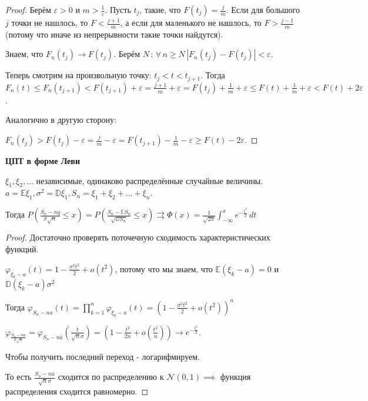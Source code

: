 \begin{proof}
    Берём $\varepsilon > 0$ и $m > \frac{1}{\varepsilon}$. Пусть $t_j$, такие, что $F(t_j) = \frac{j}{m}$. Если для большого $j$ точки не нашлось, то
    $F < \frac{j + 1}{m}$, а если для маленького не нашлось, то $F > \frac{j - 1}{m}$ (потому что иначе из непрерывности такие точки найдутся).

    Знаем, что $F_n(t_j) \rightarrow F(t_j)$. Берём $N \, : \, \forall \, n \geqslant N \, |F_n(t_j) - F(t_j)| < \varepsilon$.

    Теперь смотрим на произвольную точку: $t_j < t < t_{j + 1}$. Тогда
    $F_n(t) \leqslant F_n(t_{j + 1}) < F(t_{j + 1}) + \varepsilon = \frac{j + 1}{m} + \varepsilon = F(t_j) + \frac{1}{m} + \varepsilon \leqslant F(t) + \frac{1}{m} + \varepsilon < F(t) + 2\varepsilon$.

    Аналогично в другую сторону:

    $F_n (t_j) > F(t_j) - \varepsilon = \frac{j}{m} - \varepsilon = F(t_{j + 1}) - \frac{1}{m} - \varepsilon \geqslant F(t) - 2\varepsilon$.

\end{proof}


\begin{theorem}
    \textbf{ЦПТ в форме Леви}

    $\xi_1, \xi_2, \ldots $ независимые, одинаково распределённые случайные величины. $a = \mathbb{E} \xi_1,
    \sigma^2 = \mathbb{D} \xi_1, S_n = \xi_1 + \xi_2 + \ldots + \xi_n$.

    Тогда $P \left ( \frac{S_n - nq}{\sigma \sqrt{n}} \leqslant x \right ) = P\left ( \frac{S_n - \mathbb{E} S_n}{\sqrt{\mathbb{D} S_n}} \leqslant x \right ) \rightrightarrows \Phi (x) = \frac{1}{\sqrt{2\pi}} \int_{-\infty}^x e^{-\frac{t^2}{2}} \, dt$
\end{theorem}

\begin{proof}
    Достаточно проверять поточечную сходимость характеристических функций.

    $\varphi_{\xi_k - a} (t) = 1 - \frac{\sigma^2 t^2}{2} + o(t^2)$, потому что
    мы знаем, что $\mathbb{E} (\xi_k - a) = 0$ и $\mathbb{D} (\xi_k - a) \sigma^2$

    Тогда $\varphi_{S_n - na} (t) = \prod\limits_{k = 1}^n \varphi_{\xi_k - a} (t) = \left ( 1 - \frac{\sigma^2t^2}{2} + o(t^2) \right )^n$

    $\varphi_{\frac{S_n - na}{\sigma \sqrt{n}}} = \varphi_{S_n - na} \left ( \frac{t}{\sqrt{n}\sigma} \right ) = \left( 1 - \frac{t^2}{2n} + o(\frac{t^2}{n}) \right) \rightarrow e^{-\frac{t^2}{2}}$.

    Чтобы получить последний переход - логарифмируем.

    То есть $\frac{S_n - na}{\sqrt{n} \sigma}$ сходится по распределению к $\mathcal{N} (0, 1) \implies$ функция распределения сходится равномерно.
\end{proof}

